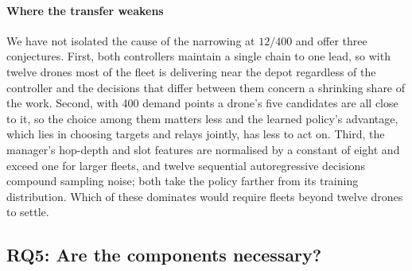 \documentclass[final,5p,times,twocolumn]{elsarticle}
\begin{document}
\begin{table}[t]
\centering
\caption{Transfer to fleets larger than any seen in training, without retraining. Cells
give the learned policy's completions, the paired median difference against the rule
(negative: learned faster), and in parentheses the learned policy's wins--losses and the
Wilcoxon signed-rank $p$.
The proposed policy is trained on $N \in \{3,4\}$ with random depots; the comparison policy is
the ablation trained on the fixed $4/50$ configuration only (two seeds).}
\label{tab:gen}
\small

\end{table}

\paragraph{Where the transfer weakens}
We have not isolated the cause of the narrowing at $12/400$ and offer three conjectures. First,
both controllers maintain a single chain to one lead, so with twelve drones most of the fleet is
delivering near the depot regardless of the controller and the decisions that differ between
them concern a shrinking share of the work. Second, with 400 demand points a drone's five
candidates are all close to it, so the choice among them matters less and the learned policy's
advantage, which lies in choosing targets and relays jointly, has less to act on. Third, the
manager's hop-depth and slot features are normalised by a constant of eight and exceed one for
larger fleets, and twelve sequential autoregressive decisions compound sampling noise; both take
the policy farther from its training distribution. Which of these dominates would require fleets
beyond twelve drones to settle.

\subsection{RQ5: Are the components necessary?}
\label{sec:rq5}
\end{document}
